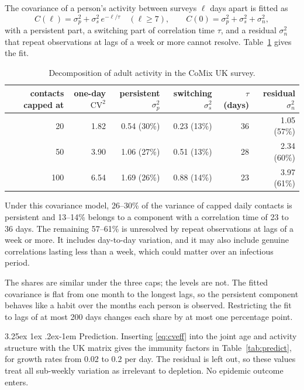 \documentclass[11pt]{article}
\makeatletter
\renewcommand\paragraph{\@startsection{paragraph}{4}{\z@}%
  {3.25ex \@plus1ex \@minus.2ex}{-1em}%
  {\normalfont\normalsize\itshape}}
\theoremstyle{remark}
\newcommand{\CV}{\mathrm{CV}}
\makeatother
\begin{document}
The covariance of a person's activity between surveys $\ell$ days apart is fitted as
\begin{equation}
  C(\ell) = \sigma_p^2 + \sigma_s^2\,e^{-\ell/\tau} \quad (\ell \ge 7), \qquad C(0) = \sigma_p^2 + \sigma_s^2 + \sigma_n^2 ,
\end{equation}
with a persistent part, a switching part of correlation time $\tau$, and a residual $\sigma_n^2$ that repeat
observations at lags of a week or more cannot resolve. Table~\ref{tab:comix} gives the fit.

\begin{table}[h]
\centering
\begin{tabular}{rrrrrr}
\toprule
contacts capped at & one-day $\CV^2$ & persistent $\sigma_p^2$ & switching $\sigma_s^2$ & $\tau$ (days) & residual $\sigma_n^2$ \\
\midrule
20 & 1.82 & 0.54 (30\%) & 0.23 (13\%) & 36 & 1.05 (57\%) \\
50 & 3.90 & 1.06 (27\%) & 0.51 (13\%) & 28 & 2.34 (60\%) \\
100 & 6.54 & 1.69 (26\%) & 0.88 (14\%) & 23 & 3.97 (61\%) \\
\bottomrule
\end{tabular}
\caption{Decomposition of adult activity in the CoMix UK survey.}\label{tab:comix}
\end{table}

Under this covariance model, 26--30\% of the variance of capped daily contacts is persistent and 13--14\% belongs to a
component with a correlation time of 23 to 36 days. The remaining 57--61\% is unresolved by repeat observations at
lags of a week or more. It includes day-to-day variation, and it may also include genuine correlations lasting less
than a week, which could matter over an infectious period.

The shares are similar under the three caps; the levels are not. The fitted covariance is flat from one month to the
longest lags, so the persistent component behaves like a habit over the months each person is observed. Restricting
the fit to lags of at most 200 days changes each share by at most one percentage point.

\paragraph{Prediction.} Inserting \eqref{eq:cveff} into the joint age and activity structure with the UK matrix gives
the immunity factors in Table~\ref{tab:predict}, for growth rates from 0.02 to 0.2 per day. The residual is left
out, so these values treat all sub-weekly variation as irrelevant to depletion. No epidemic outcome enters.
\end{document}
